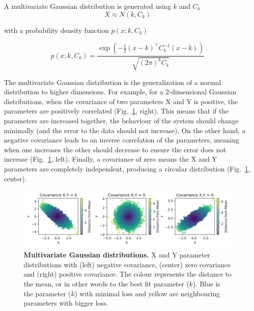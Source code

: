A multivariate Gaussian distribution is generated using $k$ and $C_{k}$
\begin{equation}
    X \approx N(k,C_k)
\end{equation}

with a probability density function $p(x;k,C_k )$

\begin{equation}
    p(x;k,C_k )= \frac{\exp\left(-\frac{1}{2} (x - k)^\top C_k^{-1} (x - k)\right)}{\sqrt{(2\pi)^k C_k}}
\end{equation}

The multivariate Gaussian distribution is the generalization of a normal distribution to higher dimensions.
For example, for a 2-dimensional Gaussian distributions,
when the covariance of two parameters X and Y is positive, the parameters are positively correlated
(Fig.~\ref{fig:multivariate_gaussians}, right).
This means that if the parameters are increased together, the behaviour of the system should change minimally
(and the error to the data should not increase).
On the other hand, a negative covariance leads to an inverse correlation of the parameters,
meaning when one increases the other should decrease to ensure the error does not increase
(Fig.~\ref{fig:multivariate_gaussians}, left).
Finally, a covariance of zero means the X and Y parameters are completely independent,
producing a circular distribution (Fig.~\ref{fig:multivariate_gaussians}, center).

\begin{figure}[H] %
    \centering
    \begin{adjustbox}{center}
        \includegraphics[width=1\textwidth]{chapters/Chapter 2/multivariate_gaussians} %
    \end{adjustbox}
    \caption{\textbf{Multivariate Gaussian distributions.} X and Y parameter distributions with (left) negative covariance, (center) zero covariance and (right) positive covariance.
    The colour represents the distance to the mean, or in other words to the best fit parameter ($k$).
    Blue is the parameter ($k$) with minimal loss and yellow are neighbouring parameters with bigger loss.}
    \label{fig:multivariate_gaussians} %
\end{figure}

